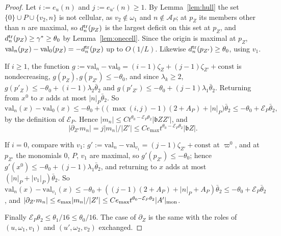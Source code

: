 \begin{proof}
Let $i:=e_u(n)$ and $j:=e_{u'}(n)\ge1$. By Lemma~\ref{lem:hull} the set $\{0\}\cup P\cup\{v_2,n\}$ is not cellular, as
$v_2\notin\omega_1$ and $n\notin\mathcal A_P$; at $p_Z$ its members other than $n$ are maximal, so $d^{\rm tr}_n(p_Z)$ is the
largest deficit on this set at $p_Z$, and $d^{\rm tr}_n(p_Z)\ge\gamma^*\ge\theta_0$ by Lemma~\ref{lem:onecell}. Since the
origin is maximal at $p_Z$, $\mathrm{val}_n(p_Z)-\mathrm{val}_0(p_Z)=-d^{\rm tr}_n(p_Z)$ up to $O(1/L)$. Likewise
$d^{\rm tr}_n(p_{Z'})\ge\theta_0$, using $v_1$.

If $i\ge1$, the function $g:=\mathrm{val}_n-\mathrm{val}_0=(i-1)\zeta_Z+(j-1)\zeta_{Z'}+\mathrm{const}$ is nondecreasing,
$g(p_Z),g(p_{Z'})\le-\theta_0$, and since $\lambda_k\ge2$, $g(p'_Z)\le-\theta_0+(i-1)\lambda_2\bar\theta_2$ and
$g(p'_{Z'})\le-\theta_0+(j-1)\lambda_1\bar\theta_2$. Returning from $x^0$ to $x$ adds at most $|n|_P\bar\theta_2$. So
\[
\mathrm{val}_n(x)-\mathrm{val}_0(x)\le-\theta_0+\bigl((\max(i,j)-1)(2+A_P)+|n|_P\bigr)\bar\theta_2\le-\theta_0+\mathcal E_P\bar\theta_2 ,
\]
by the definition of $\mathcal E_P$. Hence $|m_n|\le Ct^{\theta_0-\mathcal E_P\theta_2}|\mathfrak bZZ'|$, and
\[
|\partial_{Z'}m_n|=j|m_n|/|Z'|\le Ce_{\max}t^{\theta_0-\mathcal E_P\theta_2}|\mathfrak bZ| .
\]

If $i=0$, compare with $v_1$: $g':=\mathrm{val}_n-\mathrm{val}_{v_1}=(j-1)\zeta_{Z'}+\mathrm{const}$ at $\varpi^0$, and at $p_{Z'}$
the monomials $0$, $P$, $v_1$ are maximal, so $g'(p_{Z'})\le-\theta_0$; hence
$g'(x^0)\le-\theta_0+(j-1)\lambda_1\bar\theta_2$, and returning to $x$ adds at most $(|n|_P+|v_1|_P)\bar\theta_2$. So
$\mathrm{val}_n(x)-\mathrm{val}_{v_1}(x)\le-\theta_0+((j-1)(2+A_P)+|n|_P+A_P)\bar\theta_2\le-\theta_0+\mathcal E_P\bar\theta_2$, and
$|\partial_{Z'}m_n|\le e_{\max}|m_n|/|Z'|\le Ce_{\max}t^{\theta_0-\mathcal E_P\theta_2}|A'|_{\rm mon}$.

Finally $\mathcal E_P\theta_2\le\theta_1/16\le\theta_0/16$. The case of $\partial_Z$ is the same with the roles of
$(u,\omega_1,v_1)$ and $(u',\omega_2,v_2)$ exchanged.
\end{proof}

